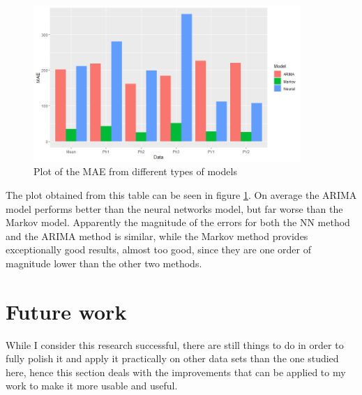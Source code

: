 \documentclass[12pt,a4paper,titlepage]{report}
\begin{document}
%
\begin{figure}[h]
    \centering
    \includegraphics[width=0.9\textwidth]{doverallcomparisonplot}
    \caption{Plot of the MAE from different types of models}
    \label{doverallcomparisonplot}
\end{figure}

The plot obtained from this table can be seen in figure \ref{doverallcomparisonplot}. On average the ARIMA model performs better than the neural networks model, but far worse than the Markov model. Apparently the magnitude of the errors for both the NN method and the ARIMA method is similar, while the Markov method provides exceptionally good results, almost too good, since they are one order of magnitude lower than the other two methods.

\section{Future work}

While I consider this research successful, there are still things to do in order to fully polish it and apply it practically on other data sets than the one studied here, hence this section deals with the improvements that can be applied to my work to make it more usable and useful.
\end{document}
